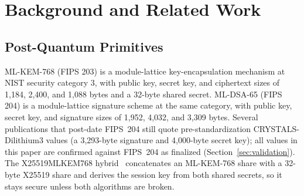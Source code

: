 \documentclass[conference]{IEEEtran}
\begin{document}
\section{Background and Related Work}

\subsection{Post-Quantum Primitives}
ML-KEM-768 (FIPS 203) is a module-lattice key-encapsulation mechanism at NIST security category 3,
with public key, secret key, and ciphertext sizes of 1,184, 2,400, and 1,088 bytes and a 32-byte
shared secret. ML-DSA-65 (FIPS 204) is a module-lattice signature scheme at the same category, with
public key, secret key, and signature sizes of 1,952, 4,032, and 3,309 bytes. Several publications
that post-date FIPS~204 still quote pre-standardization CRYSTALS-Dilithium3 values (a 3,293-byte
signature and 4,000-byte secret key); all values in this paper are confirmed against FIPS~204 as
finalized (Section~\ref{sec:validation}). The X25519MLKEM768 hybrid~\cite{ietf-ecdhe-mlkem}
concatenates an ML-KEM-768 share with a 32-byte X25519 share and derives the session key from both
shared secrets, so it stays secure unless both algorithms are broken.
\end{document}
